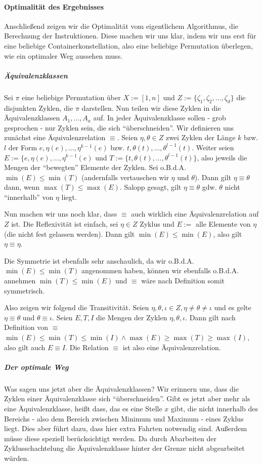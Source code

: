 \paragraph{Optimalität des Ergebnisses}
Anschließend zeigen wir die Optimalität vom eigentlichem Algorithmus, die Berechnung der Instruktionen.
Diese machen wir uns klar, indem wir uns erst für eine beliebige Containerkonstellation, also eine beliebige Permutation überlegen, wie ein optimaler Weg aussehen muss.
\subparagraph{Äquivalenzklassen}
Sei $\pi$ eine beliebige Permutation über $X := [1,n]$ und $Z := \{\zeta_1, \zeta_2, \dots, \zeta_d\}$ die disjunkten Zyklen, die $\pi$ darstellen.
Nun teilen wir diese Zyklen in die Äquivalenzklassen $A_1, \dots, A_a$ auf.
In jeder Äquivalenzklasse sollen - grob gesprochen - nur Zyklen sein, die sich ``überschneiden''.
Wir definieren uns zunächst eine Äquivalenzrelation $\equiv$.
Seien $\eta,\theta \in Z$ zwei Zyklen der Länge $k$ bzw. $l$ der Form $e, \eta(e), \dots, \eta^{k-1}(e)$ bzw. $t, \theta(t), \dots, \theta^{l-1}(t)$.
Weiter seien $E := \{e, \eta(e), \dots, \eta^{k-1}(e)$ und $T := \{t, \theta(t), \dots, \theta^{l-1}(t)\}$, also jeweils die Mengen der ``bewegten'' Elemente der Zyklen.
Sei o.B.d.A. $\min(E) \leq \min(T)$ (andernfalls vertauschen wir $\eta$ und $\theta$). Dann gilt $\eta \equiv \theta$ dann, wenn $\max(T) \leq \max(E)$.
Salopp gesagt, gilt $\eta \equiv \theta$ gdw. $\theta$ nicht ``innerhalb'' von $\eta$ liegt.

Nun machen wir uns noch klar, dass $\equiv$ auch wirklich eine Äquivalenzrelation auf $Z$ ist.
Die Reflexivität ist einfach, sei $\eta \in Z$ Zyklus und $E := $ alle Elemente von $\eta$ (die nicht fest gelassen werden).
Dann gilt $\min(E) \leq \min(E)$, also gilt $\eta \equiv \eta$.

Die Symmetrie ist ebenfalls sehr anschaulich, da wir o.B.d.A. $\min(E) \leq \min(T)$ angenommen haben,
können wir ebenfalls o.B.d.A. annehmen $\min(T) \leq \min(E)$ und $\equiv$ wäre nach Definition somit symmetrisch.

Also zeigen wir folgend die Transitivität.
Seien $\eta, \theta, \iota \in Z, \eta \neq \theta \neq \iota$ und es gelte $\eta \equiv \theta$ und $\theta \equiv \iota$.
Seien $E,T,I$ die Mengen der Zyklen $\eta, \theta, \iota$.
Dann gilt nach Definition von $\equiv$ $\min(E) \leq \min(T) \leq \min(I) \wedge \max(E) \geq \max(T) \geq \max(I)$, also gilt auch $E \equiv I$.
Die Relation $\equiv$ ist also eine Äquivalenzrelation.
\subparagraph{Der optimale Weg}
Was sagen uns jetzt aber die Äquivalenzklassen? Wir erinnern uns, dass die Zyklen einer Äquivalenzklasse sich ``überschneiden''.
Gibt es jetzt aber mehr als eine Äquivalenzklasse, heißt dass, das es eine Stelle $x$ gibt, die nicht innerhalb des Bereichs - also dem Bereich zwischen Minimum und Maximum - eines Zyklus liegt.
Dies aber führt dazu, dass hier extra Fahrten notwendig sind. Außerdem müsse diese speziell berücksichtigt werden.
Da durch Abarbeiten der Zyklusschachtelung die Äquivalenzklasse hinter der Grenze nicht abgearbeitet würden. 

